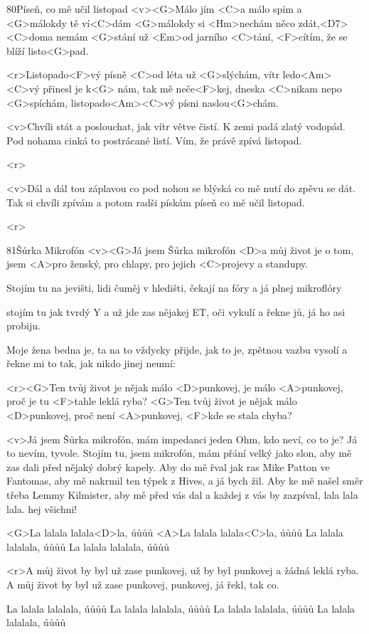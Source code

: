 \begin{song}{80}{Píseň, co mě učil listopad}{}
	<v><G>Málo jím <C>a málo spím a <G>málokdy tě ví<C>dám
	<G>málokdy si <Hm>nechám něco zdát,<D7>
	<C>doma nemám <G>stání už <Em>od jarního <C>tání,
	<F>cítím, že se blíží listo<G>pad.

	<r>Listopado<F>vý písně <C>od léta už <G>slýchám,
	vítr ledo<Am><C>vý přinesl je k<G> nám,
	tak mě neče<F>kej, dneska <C>nikam nepo <G>spíchám,
	listopado<Am><C>vý písni naslou<G>chám.

	<v>Chvíli stát a poslouchat,
	jak vítr větve čistí.
	K zemi padá zlatý vodopád.
	Pod nohama cinká
	to postrácané listí.
	Vím, že právě
	zpívá listopad.

	<r>

	<v>Dál a dál tou záplavou
	co pod nohou se blýská
	co mě nutí do zpěvu
	se dát.
	Tak si chvíli zpívám
	a potom radši pískám
	píseň co mě
	učil listopad.

	<r>
\end{song}

\begin{song}{81}{Šúrka Mikrofón}{}
	<v><G>Já jsem Šůrka mikrofón
	<D>a můj život je o tom,
	jsem <A>pro ženský, pro chlapy,
	pro jejich <C>projevy a standupy.

	Stojím tu na jevišti,
	lidi čuměj v hledišti,
	čekají na fóry
	a já plnej mikroflóry

	stojím tu jak tvrdý Y
	a už jde zas nějakej ET,
	oči vykulí a řekne jů,
	já ho asi probiju.

	Moje žena bedna je,
	ta na to vždycky přijde, jak to je,
	zpětnou vazbu vysolí
	a řekne mi to tak, jak nikdo jinej neumí:

	<r><G>Ten tvůj život je nějak málo <D>punkovej,
	je málo <A>punkovej,
	proč je tu <F>tahle leklá ryba?
	<G>Ten tvůj život je nějak málo <D>punkovej,
	proč není <A>punkovej,
	<F>kde se stala chyba?

	<v>Já jsem Šůrka mikrofón,
	mám impedanci jeden Ohm,
	kdo neví, co to je?
	Já to nevím, tyvole.
	Stojím tu, jsem mikrofón,
	mám přání velký jako slon,
	aby mě zas dali
	před nějaký dobrý kapely.
	Aby do mě řval jak ras
	Mike Patton ve Fantomas,
	aby mě nakrmil
	ten týpek z Hives,
	a já bych žil.
	Aby ke mě našel směr
	třeba Lemmy Kilmister,
	aby mě před vás dal
	a každej z vás by zazpíval, lala lala lala.
	hej všichni!

	<G>La lalala lalala<D>la, úůůů
	<A>La lalala lalala<C>la, úůůů
	La lalala lalalala, úůůů
	La lalala lalalala, úůůů

	<r>A můj život by byl už zase punkovej,
	už by byl punkovej
	a žádná leklá ryba.
	A můj život by byl už zase punkovej,
	punkovej,
	já řekl, tak co.

	La lalala lalalala, úůůů
	La lalala lalalala, úůůů
	La lalala lalalala, úůůů
	La lalala lalalala, úůůů
\end{song}

